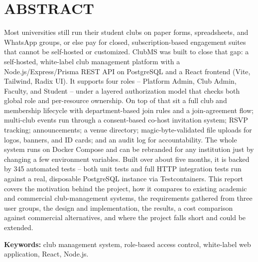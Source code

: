 \documentclass[12pt,oneside]{book}
\begin{document}
\chapter*{ABSTRACT}

Most universities still run their student clubs on paper forms, spreadsheets, and WhatsApp groups, or else pay for closed, subscription-based engagement suites that cannot be self-hosted or customized. ClubMS was built to close that gap: a self-hosted, white-label club management platform with a Node.js/Express/Prisma REST API on PostgreSQL and a React frontend (Vite, Tailwind, Radix UI). It supports four roles -- Platform Admin, Club Admin, Faculty, and Student -- under a layered authorization model that checks both global role and per-resource ownership. On top of that sit a full club and membership lifecycle with department-based join rules and a join-agreement flow; multi-club events run through a consent-based co-host invitation system; RSVP tracking; announcements; a venue directory; magic-byte-validated file uploads for logos, banners, and ID cards; and an audit log for accountability. The whole system runs on Docker Compose and can be rebranded for any institution just by changing a few environment variables. Built over about five months, it is backed by 345 automated tests -- both unit tests and full HTTP integration tests run against a real, disposable PostgreSQL instance via Testcontainers. This report covers the motivation behind the project, how it compares to existing academic and commercial club-management systems, the requirements gathered from three user groups, the design and implementation, the results, a cost comparison against commercial alternatives, and where the project falls short and could be extended.

\vspace{0.5cm}
\noindent\textbf{Keywords:} club management system, role-based access control, white-label web application, React, Node.js.

\tableofcontents
\listoffigures
\listoftables

\mainmatter
\end{document}
